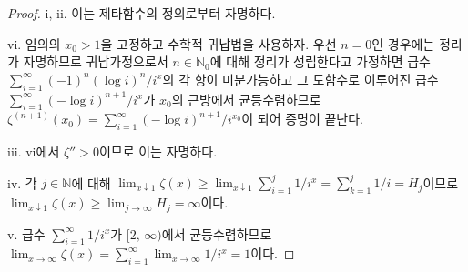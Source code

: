 \begin{proof}
    i, ii. 이는 제타함수의 정의로부터 자명하다.

    vi. 임의의 $x_0>1$을 고정하고 수학적 귀납법을 사용하자. 우선 $n=0$인 경우에는 정리가 자명하므로 귀납가정으로서 $n\in\mathbb{N}_0$에 대해 정리가 성립한다고 가정하면 급수 $\sum_{i=1}^\infty(-1)^n(\log i)^n/i^x$의 각 항이 미분가능하고 그 도함수로 이루어진 급수 $\sum_{i=1}^\infty(-\log i)^{n+1}/i^x$가 $x_0$의 근방에서 균등수렴하므로\footnotemark $\zeta^{(n+1)}(x_0)=\sum_{i=1}^\infty(-\log i)^{n+1}/i^{x_0}$이 되어 증명이 끝난다.

    iii. vi에서 $\zeta''>0$이므로 이는 자명하다.

    iv. 각 $j\in\mathbb{N}$에 대해 $\lim_{x\downarrow1}\zeta(x)\geq\lim_{x\downarrow1}\sum_{i=1}^j1/i^x=\sum_{k=1}^j1/i=H_j$이므로 $\lim_{x\downarrow1}\zeta(x)\geq\lim_{j\to\infty}H_j=\infty$이다.

    v. 급수 $\sum_{i=1}^\infty1/i^x$가 $[2,\,\infty)$에서 균등수렴하므로\footnotemark $\lim_{x\to\infty}\zeta(x)=\sum_{i=1}^\infty\lim_{x\to\infty}1/i^x=1$이다.
\end{proof}

